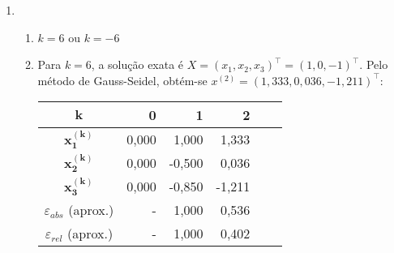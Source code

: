 \documentclass[12pt,a4paper]{article}
\begin{document}
\begin{enumerate}
\begin{enumerate}
\end{enumerate}
\item \begin{enumerate}
\item $k = 6$ ou $k = -6$
\item Para $k = 6$, a solução exata é $X = (x_1, x_2, x_3)^\intercal = (1, 0, -1)^\intercal$. Pelo método de Gauss-Seidel, obtém-se $x^{(2)} = (1,333, 0,036, -1,211)^\intercal:
$
\medskip
\begin{center}
\begin{tabular}{crrrrr}
\hline
$\boldsymbol{k}$     & 0 & 1 & 2\\
\hline
$\boldsymbol{x_1^{(k)}}$ & 0,000 & 1,000 & 1,333 \\
$\boldsymbol{x_2^{(k)}}$ & 0,000 & -0,500 & 0,036 \\
$\boldsymbol{x_3^{(k)}}$ & 0,000 & -0,850 & -1,211 \\
\hline
$\varepsilon_{abs}$ (aprox.) & - & 1,000 & 0,536 \\
\hline
$\varepsilon_{rel}$ (aprox.) & - & 1,000 & 0,402 \\
\hline
\end{tabular}
\end{center}
\end{enumerate}



\end{enumerate}
\end{document}
